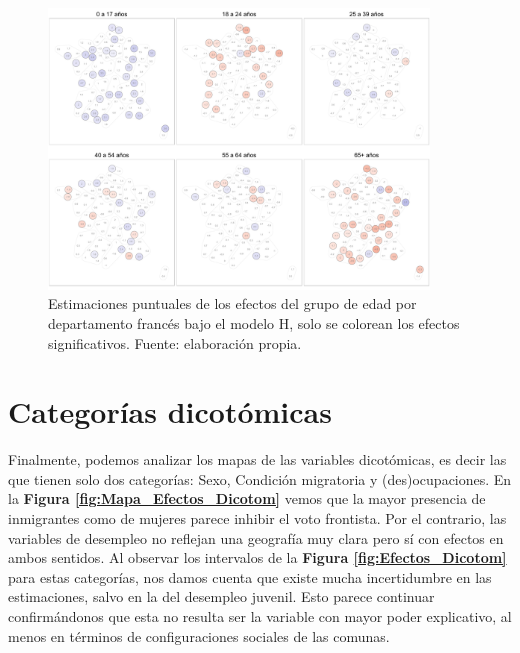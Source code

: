 \begin{figure}
	\centering
	\includegraphics[width = 0.9\textwidth]{Figs/Efectos/Dorling_Efectos_Edad_Modelo_H}
	\caption{Estimaciones puntuales de los efectos del grupo de edad por departamento francés bajo el modelo H, solo se colorean los efectos significativos. Fuente: elaboración propia.}
	\label{fig:Dorling_Efectos_Edad}
\end{figure}

\section{Categorías dicotómicas}

Finalmente, podemos analizar los mapas de las variables dicotómicas, es decir las que tienen solo dos categorías: Sexo, Condición migratoria y (des)ocupaciones. En la \textbf{Figura \ref{fig:Mapa_Efectos_Dicotom}} vemos que la mayor presencia de inmigrantes como de mujeres parece inhibir el voto frontista. Por el contrario, las variables de desempleo no reflejan una geografía muy clara pero sí con efectos en ambos sentidos. Al observar los intervalos de la \textbf{Figura \ref{fig:Efectos_Dicotom}} para estas categorías, nos damos cuenta que existe mucha incertidumbre en las estimaciones, salvo en la del desempleo juvenil. Esto parece continuar confirmándonos que esta no resulta ser la variable con mayor poder explicativo, al menos en términos de configuraciones sociales de las comunas.\\ 

